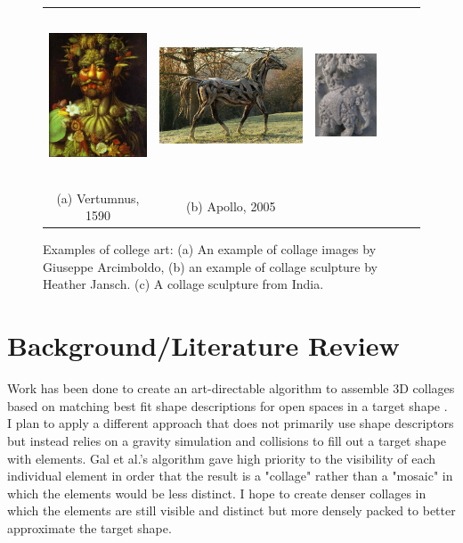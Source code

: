 \documentclass{article}
\begin{document}
\begin{figure}[htbp]
\begin{tabular}{cccccc}
\includegraphics[height=2.00in]{images/archimboldo}&
\includegraphics[height=2.00in]{images/jansch}&
\includegraphics[height=2.00in]{images/elephant}\\
(a) Vertumnus, 1590 & (b) Apollo, 2005 \\
\end{tabular}
\caption{Examples of college art: (a) An example of collage images by Giuseppe Arcimboldo, (b) an example of collage sculpture by Heather Jansch.  (c) A collage sculpture from India. }
\label{fig:regions}
\end{figure}

\section{Background/Literature Review}

\cite{Kim2002}

Work has been done to create an art-directable algorithm to assemble 3D collages based on matching best fit shape descriptions for open spaces in a target shape  \cite{Gal2007}. I plan to apply a different approach that does not primarily use shape descriptors but instead relies on a gravity simulation and collisions to fill out a target shape with elements. Gal et al.'s algorithm gave high priority to the visibility of each individual element in order that the result is a "collage" rather than a "mosaic" in which the elements would be less distinct.  I hope to create denser collages in which the elements are still visible and distinct but more densely packed to better approximate the target shape.
\end{document}
